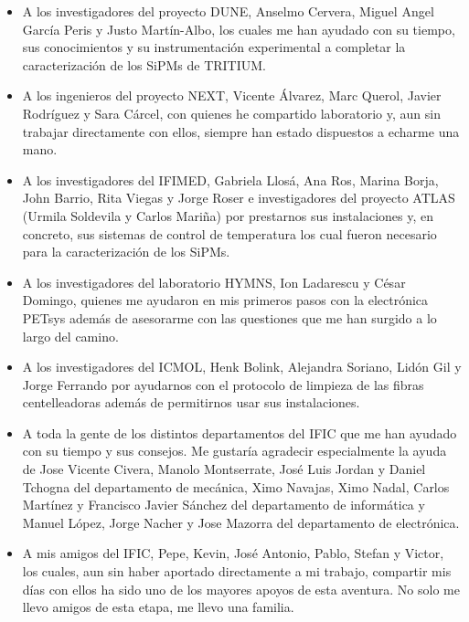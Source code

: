 \begin{itemize}

\item{} A los investigadores del proyecto DUNE, Anselmo Cervera, Miguel Angel García Peris y Justo Martín-Albo, los cuales me han ayudado con su tiempo, sus conocimientos y su instrumentación experimental a completar la caracterización de los SiPMs de TRITIUM. 

\item{} A los ingenieros del proyecto NEXT, Vicente Álvarez, Marc Querol, Javier Rodríguez y Sara Cárcel, con quienes he compartido laboratorio y, aun sin trabajar directamente con ellos, siempre han estado dispuestos a echarme una mano. 

\item{} A los investigadores del IFIMED, Gabriela Llosá, Ana Ros, Marina Borja, John Barrio, Rita Viegas y Jorge Roser e investigadores del proyecto ATLAS (Urmila Soldevila y Carlos Mariña) por prestarnos sus instalaciones y, en concreto, sus sistemas de control de temperatura los cual fueron necesario para la caracterización de los SiPMs. 

\item{} A los investigadores del laboratorio HYMNS, Ion Ladarescu y César Domingo, quienes me ayudaron en mis primeros pasos con la electrónica PETsys además de asesorarme con las questiones que me han surgido a lo largo del camino.

\item{} A los investigadores del ICMOL, Henk Bolink, Alejandra Soriano, Lidón Gil y Jorge Ferrando por ayudarnos con el protocolo de limpieza de las fibras centelleadoras además de permitirnos usar sus instalaciones.

\item{} A toda la gente de los distintos departamentos del IFIC que me han ayudado con su tiempo y sus consejos. Me gustaría agradecir especialmente la ayuda de Jose Vicente Civera, Manolo Montserrate, José Luis Jordan y Daniel Tchogna del departamento de mecánica, Ximo Navajas, Ximo Nadal, Carlos Martínez y Francisco Javier Sánchez del departamento de informática y Manuel López, Jorge Nacher y Jose Mazorra del departamento de electrónica.

\item{} A mis amigos del IFIC, Pepe, Kevin, José Antonio, Pablo, Stefan y Victor, los cuales, aun sin haber aportado directamente a mi trabajo, compartir mis días con ellos ha sido uno de los mayores apoyos de esta aventura. No solo me llevo amigos de esta etapa, me llevo una familia.


\end{itemize}

